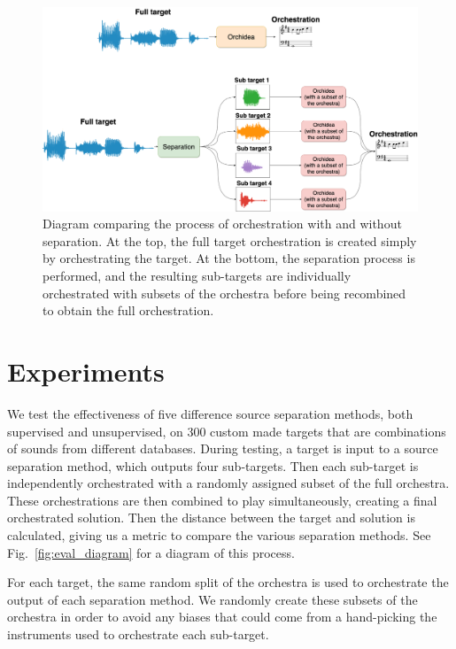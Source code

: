 \documentclass[letterpaper]{article}  %
\begin{document}
  \begin{figure}[t]
    \centering
      \includegraphics[width=\columnwidth]{figures/diagram.png}
      \caption{Diagram comparing the process of orchestration with and without separation. At the top, the full target orchestration is created simply by orchestrating the target. At the bottom, the separation process is performed, and the resulting sub-targets are individually orchestrated with subsets of the orchestra before being recombined to obtain the full orchestration.}\label{fig:full_diagram}
  \end{figure}

\section{Experiments}\label{sec:experiments}

  We test the effectiveness of five difference source separation methods, both supervised and unsupervised, on 300 custom made targets that are combinations of sounds from different databases. During testing, a target is input to a source separation method, which outputs four sub-targets. Then each sub-target is independently orchestrated with a randomly assigned subset of the full orchestra. These orchestrations are then combined to play simultaneously, creating a final orchestrated solution. Then the distance between the target and solution is calculated, giving us a metric to compare the various separation methods. See Fig.~\ref{fig:eval_diagram} for a diagram of this process.

  For each target, the same random split of the orchestra is used to orchestrate the output of each separation method. We randomly create these subsets of the orchestra in order to avoid any biases that could come from a hand-picking the instruments used to orchestrate each sub-target.
\end{document}
